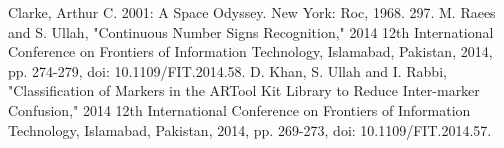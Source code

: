 \begin{thebibliography}{00}
	 Clarke, Arthur C. 2001: A Space Odyssey. New York: Roc, 1968. 297.
	 M. Raees and S. Ullah, "Continuous Number Signs Recognition," 2014 12th International Conference on Frontiers of Information Technology, Islamabad, Pakistan, 2014, pp. 274-279, doi: 10.1109/FIT.2014.58.
	 D. Khan, S. Ullah and I. Rabbi, "Classification of Markers in the ARTool Kit Library to Reduce Inter-marker Confusion," 2014 12th International Conference on Frontiers of Information Technology, Islamabad, Pakistan, 2014, pp. 269-273, doi: 10.1109/FIT.2014.57.

\end{thebibliography}